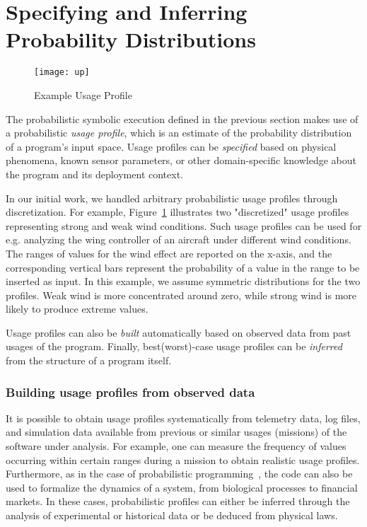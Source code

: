 \section{Specifying and Inferring Probability Distributions}
\label{sec:probspecs}

\begin{figure}
\centering
      \texttt{[image: up]}
\caption{Example Usage Profile}
\label{fig:up}
\end{figure}


The probabilistic symbolic execution defined in the previous section
makes use of a probabilistic {\em usage profile}, which is an estimate
of the probability distribution of a program's input space.  Usage
profiles can be {\em specified} based on physical phenomena, known
sensor parameters, or other domain-specific knowledge about the program
and its deployment context.  

In our initial work, we handled arbitrary probabilistic usage profiles through discretization. For example, Figure~\ref{fig:up} illustrates two "discretized" usage profiles representing strong and weak wind conditions. Such usage profiles can be used for e.g. analyzing the wing controller of an aircraft under different wind conditions. The ranges of values for the wind effect are reported on the x-axis, and the corresponding vertical bars represent the probability of a value in the range to be inserted as input. In this example, we assume symmetric distributions for the two profiles. Weak wind is more concentrated around zero, while strong wind is more likely to produce extreme values.


Usage profiles can also be {\em built}
automatically based on observed data from past usages of the program.
Finally, best(worst)-case usage profiles can be {\em inferred} from
the structure of a program itself.  

\subsubsection{Building usage profiles from observed data}
It is possible to obtain usage profiles systematically from
telemetry data, log files, and simulation
data available from previous or similar usages (missions) of 
the software under analysis.
For example, one can measure
the frequency of values occurring within certain ranges
during a mission to obtain realistic usage profiles. 
Furthermore, as in the case of probabilistic
programming~\cite{Gordon2014}, the code can also be
used to formalize the dynamics of a system, from biological processes
to financial markets. In these cases, probabilistic profiles can 
either be inferred through the analysis of experimental or historical
data or be deduced from physical laws.


